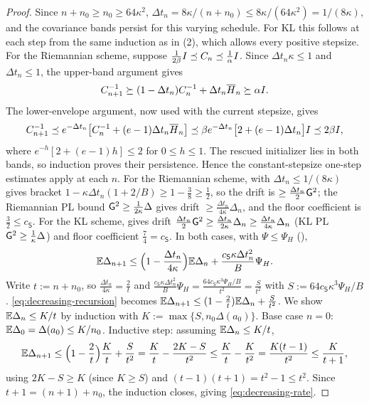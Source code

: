 \begin{proof}
Since $n+n_0\geq n_0\geq64\kappa^2$, $\Delta t_n=8\kappa/(n+n_0)\leq8\kappa/(64\kappa^2)=1/(8\kappa)$,
and the covariance bands persist for this varying schedule. For KL this follows at each step from the
same induction as in (2), which allows every positive stepsize. For the Riemannian
scheme, suppose
$\tfrac1{2\beta}I\preceq C_n\preceq\tfrac1\alpha I$. Since
$\Delta t_n\kappa\leq1$ and $\Delta t_n\leq1$, the upper-band argument gives
\[
    C_{n+1}^{-1}\succeq(1-\Delta t_n)C_n^{-1}+\Delta t_n\overline H_n\succeq\alpha I .
\]
The lower-envelope argument, now used with the current stepsize, gives
\[
    C_{n+1}^{-1}
    \preceq e^{-\Delta t_n}\bigl[C_n^{-1}+(e-1)\Delta t_n\overline H_n\bigr]
    \preceq\beta e^{-\Delta t_n}\bigl[2+(e-1)\Delta t_n\bigr]I
    \preceq2\beta I,
\]
where $e^{-h}[2+(e-1)h]\leq2$ for $0\leq h\leq1$. The rescued initializer lies in both bands, so
induction proves their persistence. Hence the constant-stepsize one-step estimates apply at each $n$.
For the Riemannian scheme,
 with $\Delta t_n\leq1/(8\kappa)$ gives bracket
$1-\kappa\Delta t_n(1+2/B)\geq1-\tfrac38\geq\tfrac12$, so the drift is $\geq\tfrac{\Delta t_n}2\mathsf{G}^2$;
the Riemannian PL bound $\mathsf{G}^2\geq\tfrac1{2\kappa}\Delta$ gives drift $\geq\tfrac{\Delta t_n}{4\kappa}\Delta_n$,
and the floor coefficient is $\tfrac32\leq c_{\mathsf S}$. For the KL scheme,
 gives drift $\tfrac{\Delta t_n}2\mathsf{G}^2\geq\tfrac{\Delta t_n}{2\kappa}\Delta_n\geq\tfrac{\Delta t_n}{4\kappa}\Delta_n$
(KL PL $\mathsf{G}^2\geq\tfrac1\kappa\Delta$) and floor coefficient $\tfrac74=c_{\mathsf S}$. In both
cases, with $\Psi\leq\Psi_H$ (),
\begin{equation}
\label{eq:decreasing-recursion}
    \mathbb{E}\Delta_{n+1}\leq\Bigl(1-\frac{\Delta t_n}{4\kappa}\Bigr)\mathbb{E}\Delta_n+\frac{c_{\mathsf S}\kappa\Delta t_n^2}B\Psi_H .
\end{equation}
Write $t:=n+n_0$, so $\tfrac{\Delta t_n}{4\kappa}=\tfrac2t$ and
$\tfrac{c_{\mathsf S}\kappa\Delta t_n^2}B\Psi_H=\tfrac{64c_{\mathsf S}\kappa^3\Psi_H/B}{t^2}=\tfrac S{t^2}$
with $S:=64c_{\mathsf S}\kappa^3\Psi_H/B$. \eqref{eq:decreasing-recursion} becomes
$\mathbb{E}\Delta_{n+1}\leq(1-\tfrac2t)\mathbb{E}\Delta_n+\tfrac S{t^2}$. We show $\mathbb{E}\Delta_n\leq K/t$ by induction
with $K:=\max\{S,n_0\Delta(a_0)\}$. Base case $n=0$: $\mathbb{E}\Delta_0=\Delta(a_0)\leq K/n_0$. Inductive
step: assuming $\mathbb{E}\Delta_n\leq K/t$,
\[
    \mathbb{E}\Delta_{n+1}\leq\Bigl(1-\frac2t\Bigr)\frac Kt+\frac S{t^2}
    =\frac Kt-\frac{2K-S}{t^2}
    \leq\frac Kt-\frac K{t^2}
    =\frac{K(t-1)}{t^2}
    \leq\frac K{t+1},
\]
using $2K-S\geq K$ (since $K\geq S$) and $(t-1)(t+1)=t^2-1\leq t^2$. Since $t+1=(n+1)+n_0$, the
induction closes, giving \eqref{eq:decreasing-rate}.
\end{proof}

